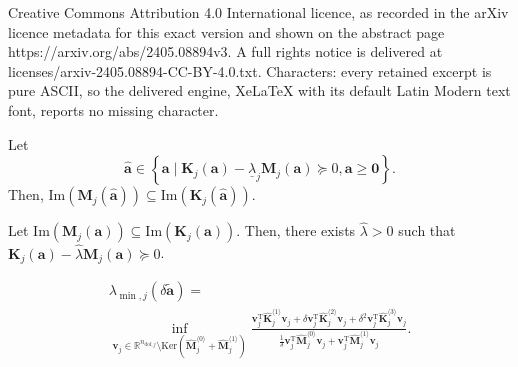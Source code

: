 \documentclass[10pt,a4paper]{amsart}
\begin{document}
Creative Commons Attribution 4.0 International licence, as recorded in the arXiv licence metadata for this exact version and shown on the abstract page https://arxiv.org/abs/2405.08894v3. A full rights notice is delivered at licenses/arxiv-2405.08894-CC-BY-4.0.txt. Characters: every retained excerpt is pure ASCII, so the delivered engine, XeLaTeX with its default Latin Modern text font, reports no missing character.
\begin{proposition}\label{lemma:dynamic_admissibility}
	Let $$\mathbf{\hat{a}}\in\left\{\mathbf{a} \; \vert \; \mathbf{K}_j(\mathbf{a}) - \underline{\lambda}_j \mathbf{M}_j(\mathbf{a}) \succeq 0, \mathbf{a}\ge \mathbf{0}\right\}.$$ Then, $\mathrm{Im}\left(\mathbf{M}_j(\hat{\mathbf{a}})\right) \subseteq \mathrm{Im}\left(\mathbf{K}_j(\hat{\mathbf{a}})\right)$.
\end{proposition}

\begin{proposition}\label{prop:exists_gamma_fv}
	Let $\mathrm{Im}(\mathbf{M}_j(\mathbf{a})) \subseteq \mathrm{Im}(\mathbf{K}_j(\mathbf{a}))$. Then, there exists $\hat{\lambda}>0$ such that
	$\mathbf{K}_j(\mathbf{a}) - \hat{\lambda} \mathbf{M}_j(\mathbf{a})\succeq 0$.
\end{proposition}

\begin{equation}\label{eq:RQs}
	\begin{multlined}
		\lambda_{\min,j}(\delta \tilde{\mathbf{a}}) =\\
		\inf_{\mathbf{v}_j \in \mathbb{R}^{n_{\mathrm{dof},j}}\setminus \mathrm{Ker}\left(\hat{\mathbf{M}}_j^{\langle 0\rangle}+\hat{\mathbf{M}}_j^{\langle 1\rangle}\right)} \frac{\mathbf{v}_j^\mathrm{T} \hat{\mathbf{K}}_j^{\langle 1\rangle}\mathbf{v}_j + \delta \mathbf{v}_j^\mathrm{T}\hat{\mathbf{K}}_j^{\langle 2\rangle} \mathbf{v}_j + \delta^2 \mathbf{v}_j^\mathrm{T}\hat{\mathbf{K}}_j^{\langle 3\rangle} \mathbf{v}_j}{\frac{1}{\delta}\mathbf{v}_j^\mathrm{T} \hat{\mathbf{M}}_j^{\langle 0\rangle} \mathbf{v}_j + \mathbf{v}_j^\mathrm{T} \hat{\mathbf{M}}_j^{\langle 1\rangle} \mathbf{v}_j}.
	\end{multlined}
\end{equation}
\end{document}
